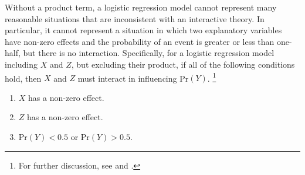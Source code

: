 \documentclass[12pt]{article}
\begin{document}
Without a product term, a logistic regression model cannot represent many reasonable situations that are inconsistent with an interactive theory. In particular, it cannot represent a situation in which two explanatory variables have non-zero effects and the probability of an event is greater or less than one-half, but there is no interaction. Specifically, for a logistic regression model including $X$ and $Z$, but excluding their product, if all of the following conditions hold, then $X$ and $Z$ must interact in influencing Pr$(Y)$. \footnote{For further discussion, see \cite{Nagler1991} and \cite{BerryDeMerittEsarey2010}.}
\begin{enumerate}
\item $X$ has a non-zero effect.
\item $Z$ has a non-zero effect.
\item $\text{Pr}(Y) < 0.5$ or $\text{Pr}(Y) > 0.5$.
\end{enumerate}
\end{document}
